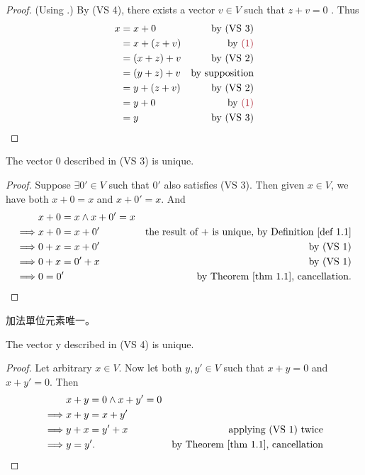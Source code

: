 \begin{proof}
(Using .)
By (VS 4), there exists a vector \(v \in V\) such that \(z + v = 0\) .
Thus
\begin{align*}
    x & = x + 0 & \text{by (VS 3)} \\
      & = x + (z + v) & \text{by \MAROON{(1)}} \\
      & = (x + z) + v & \text{by (VS 2)} \\
      & = (y + z) + v & \text{by supposition} \\
      & = y + (z + v) & \text{by (VS 2)} \\
      & = y + 0 & \text{by \MAROON{(1)}} \\
      & = y & \text{by (VS 3)}
\end{align*}
\end{proof}

\begin{corollary} \label{corollary 1.1.1}
The vector \(0\) described in  (VS 3) is unique.
\end{corollary}

\begin{proof}
Suppose \(\exists 0' \in V\) such that \(0'\) also satisfies  (VS 3).
Then given \(x \in V\), we have both \(x + 0 = x\) and \(x + 0' = x\).
And
\begin{align*}
             & x + 0 = x \land x + 0' = x \\
    \implies & x + 0 = x + 0' & \text{the result of \(+\) is unique, by \DEF{1.1}} \\
    \implies & 0 + x = x + 0' & \text{by (VS 1)} \\
    \implies & 0 + x = 0' + x & \text{by (VS 1)} \\
    \implies & 0 = 0' & \text{by \THM{1.1}, cancellation}.
\end{align*}
\end{proof}

\begin{note}
加法單位元素唯一。
\end{note}

\begin{corollary} \label{corollary 1.1.2}
The vector y described in  (VS 4) is unique.
\end{corollary}

\begin{proof}
Let arbitrary \(x \in V\).
Now let both \(y, y' \in V\) such that \(x + y = 0\) and \(x + y' = 0\).
Then
\begin{align*}
             & x + y = 0 \land x + y' = 0 \\
    \implies & x + y = x + y' \\
    \implies & y + x = y' + x & \text{applying (VS 1) twice} \\
    \implies & y = y'. & \text{by \THM{1.1}, cancellation}
\end{align*}
\end{proof}

